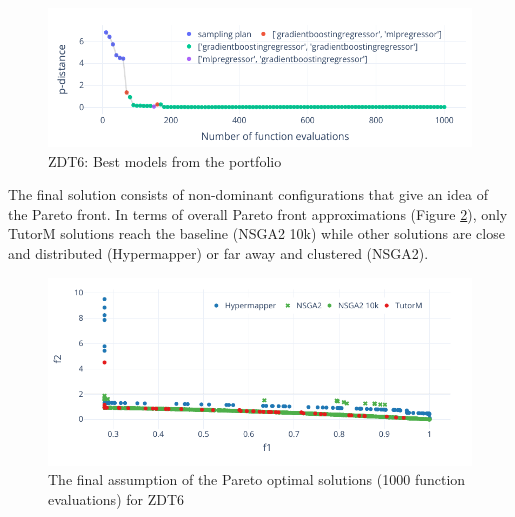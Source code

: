     \begin{figure}[!h]
        \centering
        \includegraphics[width=\textwidth]{content/images/zdt6_models}
        \caption[ZDT6: Best models from the portfolio]{ZDT6: Best models from the portfolio}
        \label{fig:zdt6_models}
    \end{figure} 
    

    
    The final solution consists of non-dominant configurations that give an idea of the Pareto front. In terms of overall Pareto front approximations (Figure \ref{fig:zdt6_front}), only TutorM solutions reach the baseline (NSGA2 10k) while other solutions are close and distributed (Hypermapper) or far away and clustered (NSGA2).

        \begin{figure}[h]
            \centering   
            \includegraphics[width=\textwidth]{content/images/zdt6_front}
            \caption[The final assumption of the Pareto optimal solutions (1000 function evaluations) for ZDT6]{The final assumption of the Pareto optimal solutions (1000 function evaluations) for ZDT6}
            \label{fig:zdt6_front}
        \end{figure}

